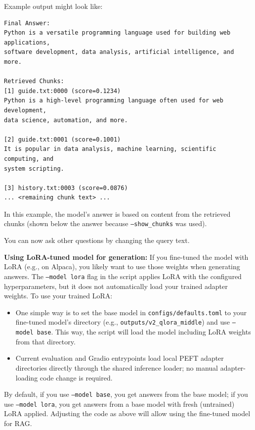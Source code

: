 \documentclass{article}
\begin{document}
Example output might look like:
\begin{verbatim}
Final Answer:
Python is a versatile programming language used for building web applications,
software development, data analysis, artificial intelligence, and more.

Retrieved Chunks:
[1] guide.txt:0000 (score=0.1234)
Python is a high-level programming language often used for web development,
data science, automation, and more.

[2] guide.txt:0001 (score=0.1001)
It is popular in data analysis, machine learning, scientific computing, and
system scripting.

[3] history.txt:0003 (score=0.0876)
... <remaining chunk text> ...
\end{verbatim}
In this example, the model’s answer is based on content from the retrieved chunks (shown below the answer because \texttt{--show\_chunks} was used).

You can now ask other questions by changing the query text.

\textbf{Using LoRA-tuned model for generation:} If you fine-tuned the model with LoRA (e.g., on Alpaca), you likely want to use those weights when generating answers. The \texttt{--model lora} flag in the script applies LoRA with the configured hyperparameters, but it does not automatically load your trained adapter weights. To use your trained LoRA:
\begin{itemize}
    \item One simple way is to set the base model in \texttt{configs/defaults.toml} to your fine-tuned model’s directory (e.g., \texttt{outputs/v2\_qlora\_middle}) and use \texttt{--model base}. This way, the script will load the model including LoRA weights from that directory.
    \item Current evaluation and Gradio entrypoints load local PEFT adapter directories directly through the shared inference loader; no manual adapter-loading code change is required.
\end{itemize}
By default, if you use \texttt{--model base}, you get answers from the base model; if you use \texttt{--model lora}, you get answers from a base model with fresh (untrained) LoRA applied. Adjusting the code as above will allow using the fine-tuned model for RAG.
\end{document}
